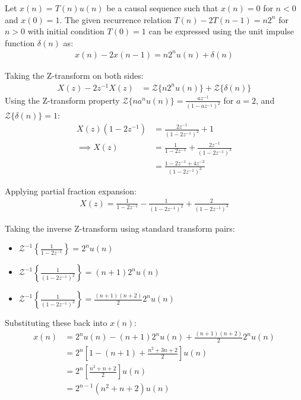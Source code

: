 \begin{enumerate}[label=\thesubsection.\arabic*, ref=\thesubsection.\theenumi]
\vspace{0.2cm}
\solution
Let $x(n) = T(n)u(n)$ be a causal sequence such that $x(n) = 0$ for $n < 0$ and $x(0) = 1$. The given recurrence relation $T(n) - 2T(n-1) = n 2^n$ for $n > 0$ with initial condition $T(0) = 1$ can be expressed using the unit impulse function $\delta(n)$ as:
\begin{align}
x(n) - 2x(n-1) = n 2^n u(n) + \delta(n)
\end{align}

Taking the Z-transform on both sides:
\begin{align}
X(z) - 2z^{-1}X(z) &= \mathcal{Z}\{n 2^n u(n)\} + \mathcal{Z}\{\delta(n)\}
\end{align}
Using the Z-transform property $\mathcal{Z}\{n a^n u(n)\} = \frac{a z^{-1}}{(1 - a z^{-1})^2}$ for $a = 2$, and $\mathcal{Z}\{\delta(n)\} = 1$:
\begin{align}
X(z)(1 - 2z^{-1}) &= \frac{2z^{-1}}{(1 - 2z^{-1})^2} + 1 \\
\implies X(z) &= \frac{1}{1 - 2z^{-1}} + \frac{2z^{-1}}{(1 - 2z^{-1})^3} \\
             &= \frac{1 - 2z^{-1} + 4z^{-2}}{(1 - 2z^{-1})^3}
\end{align}

Applying partial fraction expansion:
\begin{align}
X(z) = \frac{1}{1 - 2z^{-1}} - \frac{1}{(1 - 2z^{-1})^2} + \frac{2}{(1 - 2z^{-1})^3}
\end{align}

Taking the inverse Z-transform using standard transform pairs:
\begin{itemize}
    \item $\mathcal{Z}^{-1}\left\{\frac{1}{1 - 2z^{-1}}\right\} = 2^n u(n)$
    \item $\mathcal{Z}^{-1}\left\{\frac{1}{(1 - 2z^{-1})^2}\right\} = (n+1)2^n u(n)$
    \item $\mathcal{Z}^{-1}\left\{\frac{1}{(1 - 2z^{-1})^3}\right\} = \frac{(n+1)(n+2)}{2} 2^n u(n)$
\end{itemize}

Substituting these back into $x(n)$:
\begin{align}
x(n) &= 2^n u(n) - (n+1)2^n u(n) + \frac{(n+1)(n+2)}{2} 2^n u(n) \\
     &= 2^n \left[ 1 - (n+1) + \frac{n^2 + 3n + 2}{2} \right] u(n) \\
     &= 2^n \left[ \frac{n^2 + n + 2}{2} \right] u(n) \\
     &= 2^{n-1} (n^2 + n + 2) u(n)
\end{align}


\end{enumerate}
